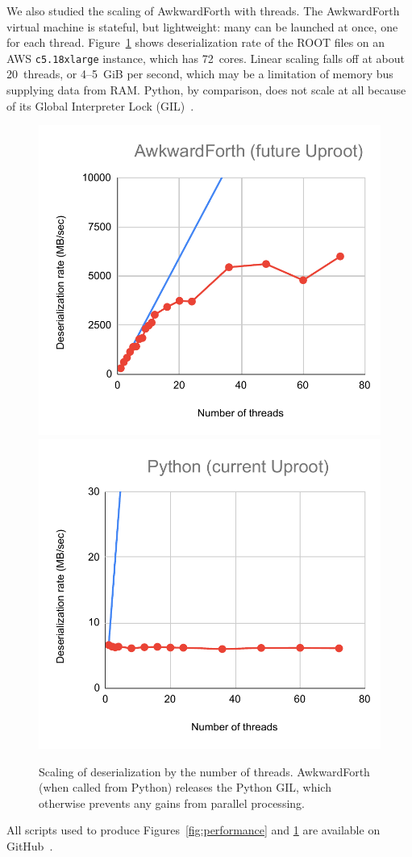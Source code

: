 \documentclass{webofc}
\begin{document}
We also studied the scaling of AwkwardForth with threads. The AwkwardForth virtual machine is stateful, but lightweight: many can be launched at once, one for each thread. Figure~\ref{fig:scaling} shows deserialization rate of the ROOT files on an AWS {\tt c5.18xlarge} instance, which has 72~cores. Linear scaling falls off at about 20~threads, or 4--5~GiB per second, which may be a limitation of memory bus supplying data from RAM. Python, by comparison, does not scale at all because of its Global Interpreter Lock (GIL)~\cite{python-gil}.

\begin{figure}[t]
\includegraphics[width=0.5\linewidth]{AwkwardForth-scaling.pdf}
\includegraphics[width=0.5\linewidth]{Python-scaling.pdf}

\caption{Scaling of deserialization by the number of threads. AwkwardForth (when called from Python) releases the Python GIL, which otherwise prevents any gains from parallel processing. \label{fig:scaling}}

\vspace{-0.5 cm}
\end{figure}

All scripts used to produce Figures~\ref{fig:performance} and \ref{fig:scaling} are available on GitHub~\cite{this-study}.

\vspace{-0.25 cm}
\end{document}
